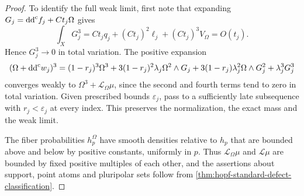 \begin{proof}
To identify the full weak limit, first note that expanding $G_j=\mathrm{dd}^{\mathrm{c}} f_j+Ct_j\Omega$ gives
\[
 \int_XG_j^3=Ct_jq_j+(Ct_j)^2\ell_j+(Ct_j)^3V_\Omega=O(t_j).
\]
Hence $G_j^3\to0$ in total variation. The positive expansion
\[
 (\Omega+\mathrm{dd}^{\mathrm{c}} w_j)^3
 =(1-r_j)^3\Omega^3
  +3(1-r_j)^2\lambda_j\Omega^2\wedge G_j
  +3(1-r_j)\lambda_j^2\Omega\wedge G_j^2
  +\lambda_j^3G_j^3
\]
converges weakly to $\Omega^3+\mathcal L_\Omega\mu$, since the second and fourth terms tend to zero in total variation. Given prescribed bounds $\varepsilon_j$, pass to a sufficiently late subsequence with $r_j<\varepsilon_j$ at every index. This preserves the normalization, the exact mass and the weak limit.

The fiber probabilities $h_p^\Omega$ have smooth densities relative to $h_p$ that are bounded above and below by positive constants, uniformly in $p$. Thus $\mathcal L_\Omega\mu$ and $\mathcal L\mu$ are bounded by fixed positive multiples of each other, and the assertions about support, point atoms and pluripolar sets follow from \cref{thm:hopf-standard-defect-classification}.
\end{proof}
